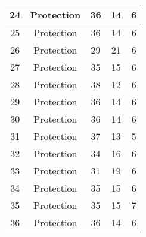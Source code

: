 \documentclass[results.tex]{subfiles}
\begin{document}
\begin{center}
\begin{tabular}{| c || c | c | c | c |}
            \hline
            24                      & Protection                   & 36                     & 14                      & 6                    \\
            \hline
            25                      & Protection                   & 36                     & 14                      & 6                    \\
            \hline
            26                      & Protection                   & 29                     & 21                      & 6                    \\
            \hline
            27                      & Protection                   & 35                     & 15                      & 6                    \\
            \hline
            28                      & Protection                   & 38                     & 12                      & 6                    \\
            \hline
            29                      & Protection                   & 36                     & 14                      & 6                    \\
            \hline
            30                      & Protection                   & 36                     & 14                      & 6                    \\
            \hline
            31                      & Protection                   & 37                     & 13                      & 5                    \\
            \hline
            32                      & Protection                   & 34                     & 16                      & 6                    \\
            \hline
            33                      & Protection                   & 31                     & 19                      & 6                    \\
            \hline
            34                      & Protection                   & 35                     & 15                      & 6                    \\
            \hline
            35                      & Protection                   & 35                     & 15                      & 7                    \\
            \hline
            36                      & Protection                   & 36                     & 14                      & 6                    \\

\end{tabular}
\end{center}
\end{document}
